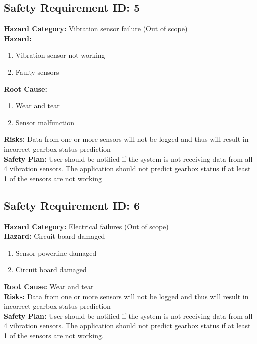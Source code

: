 \subsection{Safety Requirement ID: 5}		
\textbf{Hazard Category:} Vibration sensor failure (Out of scope)\\
\textbf{Hazard:}
\begin{enumerate}
	\item Vibration sensor not working
	\item Faulty sensors
\end{enumerate}
\textbf{Root Cause:}
\begin{enumerate}
	\item Wear and tear
	\item Sensor malfunction
\end{enumerate}
\textbf{Risks:}  Data from one or more sensors will not be logged and thus will result in incorrect gearbox status prediction\\
\textbf{Safety Plan:}
User should be notified if the system is not receiving data from all 4 vibration sensors. The application should not predict gearbox status if at least 1 of the sensors are not working 

\subsection{Safety Requirement ID: 6}		
\textbf{Hazard Category:} Electrical failures (Out of scope)\\
\textbf{Hazard:} Circuit board damaged
\begin{enumerate}
	\item Sensor powerline damaged
	\item Circuit board damaged
\end{enumerate}
\textbf{Root Cause:}
Wear and tear \\
\textbf{Risks:} Data from one or more sensors will not be logged and thus will result in incorrect gearbox status prediction\\
\textbf{Safety Plan:}
User should be notified if the system is not receiving data from all 4 vibration sensors. The application should not predict gearbox status if at least 1 of the sensors are not working.